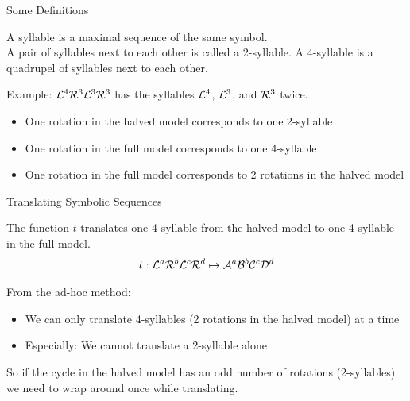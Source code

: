 \begin{frame}{Some Definitions}
	\vspace{-1em}
	\begin{definition}[Syllables]
		A syllable is a maximal sequence of the same symbol. \\[1em]
		A pair of syllables next to each other is called a 2-syllable.
		A 4-syllable is a quadrupel of syllables next to each other.
	\end{definition}
	\pause
	Example: $\mathcal{L}^4\mathcal{R}^3\mathcal{L}^3\mathcal{R}^3$ has the syllables $\mathcal{L}^4$, $\mathcal{L}^3$, and $\mathcal{R}^3$ twice.
	\vspace{1em}
	\begin{itemize}
		\pause
		\item One rotation in the halved model corresponds to one 2-syllable \pause
		\item One rotation in the full model corresponds to one 4-syllable \pause
		\item One rotation in the full model corresponds to 2 rotations in the halved model
	\end{itemize}
\end{frame}

\begin{frame}{Translating Symbolic Sequences}
	\begin{definition}
		The function $t$ translates one 4-syllable from the halved model to one 4-syllable in the full model.
		\begin{align*}
			t: \mathcal{L}^a\mathcal{R}^b\mathcal{L}^c\mathcal{R}^d \mapsto \mathcal{A}^a\mathcal{B}^b\mathcal{C}^c\mathcal{D}^d
		\end{align*}
	\end{definition}

	\pause
	From the ad-hoc method:
	\pause
	\begin{itemize}
		\item We can only translate 4-syllables (2 rotations in the halved model) at a time \pause
		\item Especially: We cannot translate a 2-syllable alone
	\end{itemize}
	\pause
	So if the cycle in the halved model has an odd number of rotations (2-syllables) we need to wrap around once while translating.
\end{frame}

